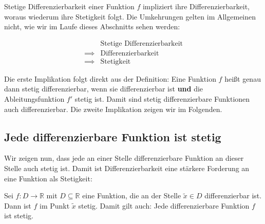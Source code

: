 \documentclass[fontsize=9pt,
               parskip=half-,
               DIV=14,
               listof=chapterentry,
               tocflat]{scrbook}
\begin{document}
Stetige Differenzierbarkeit einer Funktion $f$ impliziert ihre Differenzierbarkeit, woraus wiederum ihre Stetigkeit folgt. Die Umkehrungen gelten im Allgemeinen nicht, wie wir im Laufe dieses Abschnitts sehen werden:

\begin{align*}
&{\text{Stetige Differenzierbarkeit}}\\\implies {}&{\text{Differenzierbarkeit}}\\\implies {}&{\text{Stetigkeit}}
\end{align*}

Die erste Implikation folgt direkt aus der Definition: Eine Funktion $f$ heißt genau dann stetig differenzierbar, wenn sie differenzierbar ist \textbf{und} die Ableitungsfunktion $f'$ stetig ist. Damit sind stetig differenzierbare Funktionen auch differenzierbar. Die zweite Implikation zeigen wir im Folgenden.

\subsection{Jede differenzierbare Funktion ist stetig}

Wir zeigen nun, dass jede an einer Stelle differenzierbare Funktion an dieser Stelle auch stetig ist. Damit ist Differenzierbarkeit eine stärkere Forderung an eine Funktion als Stetigkeit:

\begin{theorem*}
Sei $f:D\to \mathbb {R} $ mit $D\subseteq \mathbb {R} $ eine Funktion, die an der Stelle ${\tilde {x}}\in D$ differenzierbar ist. Dann ist $f$ im Punkt ${\tilde {x}}$ stetig. Damit gilt auch: Jede differenzierbare Funktion $f$ ist stetig.

\end{theorem*}
\end{document}
